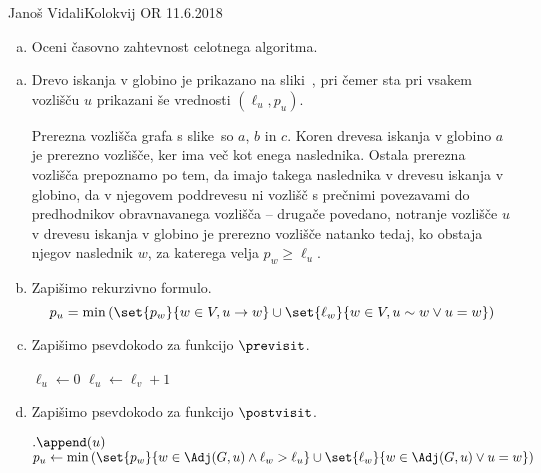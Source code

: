 \begin{naloga}{Janoš Vidali}{Kolokvij OR 11.6.2018}
\begin{vprasanje}
\begin{enumerate}[(a)]
\item Oceni časovno zahtevnost celotnega algoritma.
\end{enumerate}

\begin{slika}
\pgfslika
{}
\end{slika}
\end{vprasanje}

\begin{odgovor}
\begin{enumerate}[(a)]
\item Drevo iskanja v globino je prikazano na sliki~,
pri čemer sta pri vsakem vozlišču $u$ prikazani še vrednosti $(\ell_u, p_u)$.

Prerezna vozlišča grafa s slike~\fig so $a$, $b$ in $c$.
Koren drevesa iskanja v globino $a$ je prerezno vozlišče,
ker ima več kot enega naslednika.
Ostala prerezna vozlišča prepoznamo po tem,
da imajo takega naslednika v drevesu iskanja v globino,
da v njegovem poddrevesu ni vozlišč s prečnimi povezavami
do predhodnikov obravnavanega vozlišča
-- drugače povedano,
notranje vozlišče $u$ v drevesu iskanja v globino
je prerezno vozlišče natanko tedaj,
ko obstaja njegov naslednik $w$,
za katerega velja $p_w \ge \ell_u$.

\item Zapišimo rekurzivno formulo.
$$
p_u = \min\left(\set{p_w}{w \in V, u \to w} \cup \set{\ell_w}{w \in V, u \sim w \lor u = w}\right)
$$

\item Zapišimo psevdokodo za funkcijo $\previsit$.
\begin{small}
\begin{algorithmic}
        \State $\ell_u \gets 0$
    \Else
        \State $\ell_u \gets \ell_v + 1$
    \EndIf
\EndFunction
\end{algorithmic}
\end{small}

\item Zapišimo psevdokodo za funkcijo $\postvisit$.
\begin{small}
\begin{algorithmic}
        $.\append(u)$
    \EndIf
    \State $p_u \gets \min\left(\set{p_w}{w \in \Adj(G, u) \land \ell_w > \ell_u} \cup \set{\ell_w}{w \in \Adj(G, u) \lor u = w}\right)$
\EndFunction
\end{algorithmic}
\end{small}


\end{enumerate}
\end{odgovor}
\end{naloga}
